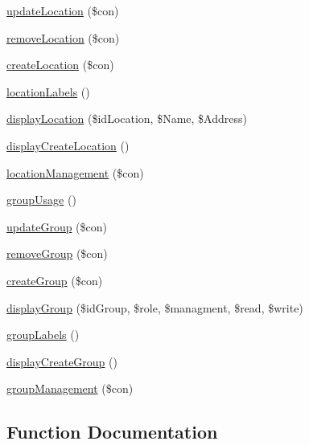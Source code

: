 \begin{DoxyCompactItemize}
\item 
\hyperlink{management_library_8php_a50791e2caa272f24d3e1b2fbe4d61569}{update\+Location} (\$con)
\item 
\hyperlink{management_library_8php_a6a015877e320f3d36c579a861f07aa47}{remove\+Location} (\$con)
\item 
\hyperlink{management_library_8php_a4a0449659d607c1eeedc42515b679e06}{create\+Location} (\$con)
\item 
\hyperlink{management_library_8php_a7f442256646f4d53a8c4fd6dd94edea0}{location\+Labels} ()
\item 
\hyperlink{management_library_8php_a56d2d4c28c2a5a6fffed1356b08cab26}{display\+Location} (\$id\+Location, \$Name, \$Address)
\item 
\hyperlink{management_library_8php_a59ed593c83786da02dbef2fef6757534}{display\+Create\+Location} ()
\item 
\hyperlink{management_library_8php_a96b5155ce51bf5818301bb9cb21eae8a}{location\+Management} (\$con)
\item 
\hyperlink{management_library_8php_a2cd213319a0fddf4c132ef0a065d90fb}{group\+Usage} ()
\item 
\hyperlink{management_library_8php_a8636b0a0fc43790af27a3eb14b557cf3}{update\+Group} (\$con)
\item 
\hyperlink{management_library_8php_a292c8baa1f3497935a0baa149bad60b9}{remove\+Group} (\$con)
\item 
\hyperlink{management_library_8php_a370e0d52cf1d46a492a1b4f9e22d2489}{create\+Group} (\$con)
\item 
\hyperlink{management_library_8php_a277865a80915b04ce5480679ddd453f4}{display\+Group} (\$id\+Group, \$role, \$managment, \$read, \$write)
\item 
\hyperlink{management_library_8php_a4c21018719f02b20dcbf3dde887b9aa0}{group\+Labels} ()
\item 
\hyperlink{management_library_8php_a3e5a997ac541ca9133453b0ad9799978}{display\+Create\+Group} ()
\item 
\hyperlink{management_library_8php_a9cfc4c4d18e3f6771e5cc6b08922d185}{group\+Management} (\$con)
\end{DoxyCompactItemize}


\subsection{Function Documentation}
